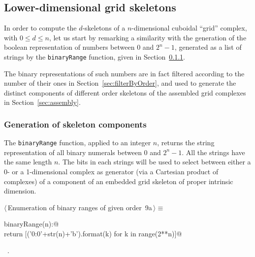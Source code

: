 \documentclass[11pt,oneside]{article}	%
\begin{document}
\subsection{Lower-dimensional grid skeletons}

In order to compute the $d$-skeletons of a $n$-dimensional cuboidal ``grid'' complex, with $0\leq d\leq n$, let us start by remarking a similarity with the generation of the boolean representation of numbers between 0 and $2^n -1$, generated as a list of strings by the \texttt{binaryRange} function, given in Section~\ref{sec:binaryRange}.

The binary representations of such numbers are in fact filtered according to the number of their ones in Section~\ref{sec:filterByOrder}, and used to generate the distinct components of different order skeletons of the assembled grid complexes in Section~\ref{sec:assembly}.

\subsubsection{Generation of skeleton components}
\label{sec:binaryRange}

The \texttt{binaryRange} function, applied to an integer $n$, returns the string representation of all binary numerals between 0 and $2^n -1$. All the strings have the same length $n$. The bits in each strings will be used to select between either a 0- or a 1-dimensional complex as generator (via a Cartesian product of complexes) of a component of an embedded grid skeleton of proper intrinsic dimension.

\begin{flushleft} \small \label{scrap11}
\protect{}$\langle\,$Enumeration of binary ranges of given order\nobreak\ {\footnotesize 9a}$\,\rangle\equiv$
\vspace{-1ex}
\begin{list}{}{} \item
\mbox{}\verb@def binaryRange(n):@\\
\mbox{}\verb@    return [('{0:0'+str(n)+'b}').format(k) for k in range(2**n)]@\\
\mbox{}\verb@@{\NWsep}
\end{list}
\vspace{-1ex}
\footnotesize\addtolength{\baselineskip}{-1ex}
\begin{list}{}{\setlength{\itemsep}{-\parsep}\setlength{\itemindent}{-\leftmargin}}
\item \NWtxtMacroRefIn\ .
\end{list}
\end{flushleft}
\end{document}
